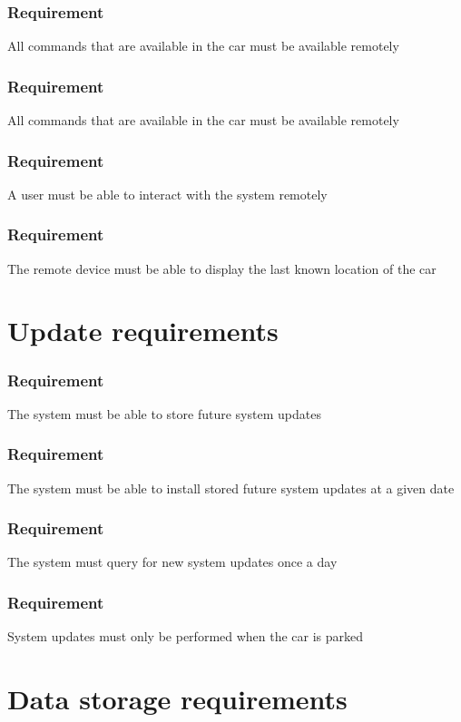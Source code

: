 \documentclass{article}
\begin{document}
{    \subsubsection{Requirement}
\hfill \break 
\- \- \-All commands that are available in the car must be available remotely
    \subsubsection{Requirement}
\hfill \break 
\- \- \-All commands that are available in the car must be available remotely
    \subsubsection{Requirement}
\hfill \break 
\- \- \-A user must be able to interact with the system remotely
    \subsubsection{Requirement}
\hfill \break 
\- \- \-The remote device must be able to display the last known location of the car

\section{Update requirements}
\setcounter{subsubsection}{0}
    \subsubsection{Requirement}
\hfill \break 
\- \- \-The system must be able to store future system updates
    \subsubsection{Requirement}
\hfill \break 
\- \- \-The system must be able to install stored future system updates at a given date
    \subsubsection{Requirement}
\hfill \break 
\- \- \-The system must query for new system updates once a day
    \subsubsection{Requirement}
\hfill \break 
\- \- \-System updates must only be performed when the car is parked

\section{Data storage requirements}
\setcounter{subsubsection}{0}
}
\end{document}

